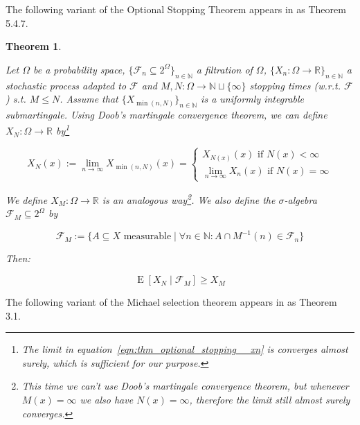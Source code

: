 \documentclass[11pt]{article}
\theoremstyle{definition}
\theoremstyle{plain}
\newtheorem{theorem}{Theorem}%
\newcommand{\Nats}{\mathbb{N}}
\newcommand{\Reals}{\mathbb{R}}
\newcommand{\Sq}[2]{\{#1\}_{#2 \in \Nats}}
\newcommand{\Sqn}[1]{\Sq{#1}{n}}
\DeclareMathOperator{\E}{E}
\newcommand{\F}{\mathcal{F}}
\begin{document}
The following variant of the Optional Stopping Theorem appears in \cite{Durrett_2010} as Theorem 5.4.7.

\begin{samepage}
\begin{theorem}
\label{thm:optional_stopping}

Let ${\Omega}$ be a probability space, ${\Sqn{\F_n \subseteq 2^\Omega}}$ a filtration of ${\Omega}$, ${\Sqn{X_n: \Omega \rightarrow \Reals}}$ a stochastic process adapted to ${\F}$ and ${M,N: \Omega \rightarrow \Nats \sqcup \{\infty\}}$ stopping times (w.r.t. ${\F}$) s.t. ${M \leq N}$. Assume that ${\Sqn{X_{\min\left(n,N\right)}}}$ is a uniformly integrable submartingale. Using Doob's martingale convergence theorem, we can define ${X_N : \Omega \rightarrow \Reals}$ by\footnote{The limit in equation~\ref{eqn:thm_optional_stopping__xn} is converges \emph{almost} surely, which is sufficient for our purpose.}

\begin{equation}
\label{eqn:thm_optional_stopping__xn}
X_N\left(x\right):=\lim_{n \rightarrow \infty} X_{\min\left(n,N\right)}\left(x\right)=\begin{cases}X_{N\left(x\right)}\left(x\right) \text{ if } N\left(x\right) < \infty\\\lim_{n \rightarrow \infty} X_n\left(x\right) \text{ if } N\left(x\right) = \infty\end{cases}
\end{equation}

We define ${X_M: \Omega \rightarrow \Reals}$ is an analogous way\footnote{This time we can't use Doob's martingale convergence theorem, but whenever ${M\left(x\right) = \infty}$ we also have ${N\left(x\right) = \infty}$, therefore the limit still almost surely converges.}. We also define the $\sigma$-algebra ${\F_M \subseteq 2^\Omega}$ by

\begin{equation}
\F_M:=\{A \subseteq X \text{ measurable} \mid \forall n \in \Nats: A \cap M^{-1}\left(n\right) \in \F_n\}
\end{equation}

Then:

\begin{equation}
\E\left[X_N \mid \F_M\right] \geq X_M
\end{equation}

\end{theorem}
\end{samepage}

The following variant of the Michael selection theorem appears in \cite{Yannelis_1983} as Theorem 3.1.
\end{document}
